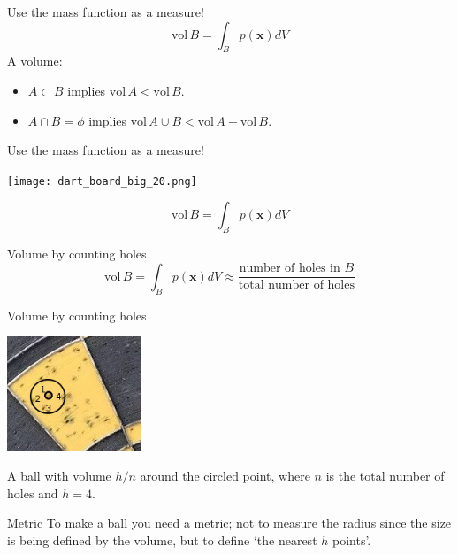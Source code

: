 \documentclass{beamer}
\begin{document}
\begin{frame}{Use the mass function as a measure!}
\color{dark}
$$\mbox{vol}\,B=\int_B p(\mathbf{x}) dV$$
\color{black}
A volume: 
\begin{itemize}
\item $A\subset B$ implies $\mbox{vol}\,A<\mbox{vol}\,B$.
\item $A\cap B=\phi$ implies $\mbox{vol}\,A\cup B<\mbox{vol}\,A+\mbox{vol}\,B$.
\end{itemize}
\end{frame}


\begin{frame}{Use the mass function as a measure!}
\color{reddish}
\begin{center}
\texttt{[image: dart\_board\_big\_20.png]}
\end{center}
\color{dark}
$$\mbox{vol}\,B=\int_B p(\mathbf{x}) dV$$
\color{black}
\end{frame}



\begin{frame}{Volume by counting holes}
\color{dark}
$$\mbox{vol}\,B=\int_B p(\mathbf{x}) dV\approx \frac{\mbox{number of holes in }B}{\mbox{total number of holes}}$$
\end{frame}

\begin{frame}{Volume by counting holes}
\color{reddish}
\begin{center}
\includegraphics[width=4cm]{dart_board_zoom_ball.png}
\end{center}
\color{black}
A ball with volume $h/n$ around the circled point, where $n$ is the total number of holes and $h=4$.
\end{frame}


\begin{frame}{Metric}
To make a ball you need a metric; not to measure the radius since the
size is being defined by the volume, but to define \lq{}the nearest
$h$ points\rq{}.
\color{reddish}
\begin{center}
\color{reddish}

\end{center}
\end{frame}
\end{document}
